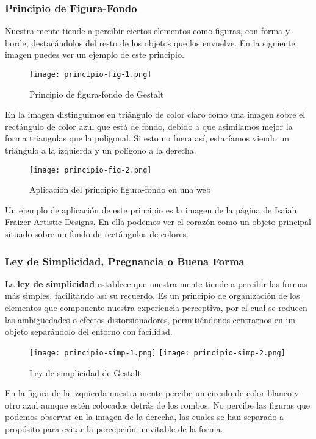 \subsubsection{Principio de Figura-Fondo}
Nuestra mente tiende a percibir ciertos elementos como figuras, con forma y borde, destacándolos del resto de los objetos que los envuelve. En la siguiente imagen puedes ver un ejemplo de este principio.

\begin{figure}[H]
    \centering
    \texttt{[image: principio-fig-1.png]}
    \caption{Principio de figura-fondo de Gestalt}
\end{figure}

En la imagen distinguimos en triángulo de color claro como una imagen sobre el rectángulo de color azul que está de fondo, debido a que asimilamos mejor la forma triangulas que la poligonal. Si esto no fuera así, estaríamos viendo un triángulo a la izquierda y un polígono a la derecha.


\begin{figure}[H]
    \centering
    \texttt{[image: principio-fig-2.png]}
    \caption{Aplicación del principio figura-fondo en una web}
\end{figure}

Un ejemplo de aplicación de este principio es la imagen de la página de Isaiah Fraizer Artistic Designs. En ella podemos ver el corazón como un objeto principal situado sobre un fondo de rectángulos de colores.

\subsubsection{Ley de Simplicidad, Pregnancia o Buena Forma}
La \textbf{ley de simplicidad} establece que nuestra mente tiende a percibir las formas más simples, facilitando así su recuerdo. Es un principio de organización de los elementos que componente nuestra experiencia perceptiva, por el cual se reducen las ambigüedades o efectos distorsionadores, permitiéndonos centrarnos en un objeto separándolo del entorno con facilidad.


\begin{figure}[H]
    \centering
    \texttt{[image: principio-simp-1.png]}
    \texttt{[image: principio-simp-2.png]}
    \caption{Ley de simplicidad de Gestalt}
\end{figure}

En la figura de la izquierda nuestra mente percibe un circulo de color blanco y otro azul aunque estén colocados detrás de los rombos. No percibe las figuras que podemos observar en la imagen de la derecha, las cuales se han separado a propósito para evitar la percepción inevitable de la forma.

